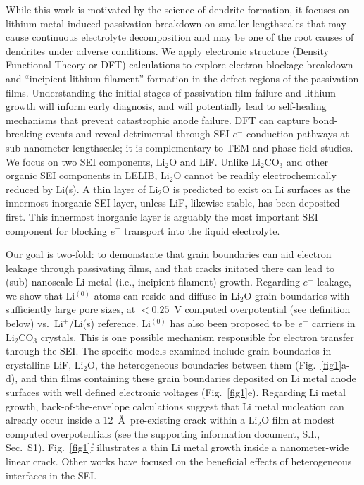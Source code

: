 \documentclass[prb,preprint,amsmath,amssymb]{revtex4}
\begin{document}
While this work is motivated by the science of dendrite formation, it
focuses on lithium metal-induced passivation breakdown on smaller lengthscales
that may cause continuous electrolyte decomposition and may be one of the
root causes of dendrites under adverse conditions.  We apply electronic
structure (Density Functional Theory or DFT) calculations to explore
electron-blockage breakdown and ``incipient lithium filament''
formation in the defect regions of the passivation films.  Understanding the
initial stages of passivation film failure and lithium growth will inform 
early diagnosis, and will potentially lead to self-healing mechanisms that
prevent catastrophic anode failure.  DFT can capture
bond-breaking events and reveal detrimental through-SEI $e^-$ conduction
pathways at sub-nanometer lengthscale; it is complementary to TEM and
phase-field studies.\cite{naturetem,garcia}  
We focus on two SEI components, Li$_2$O and LiF.
Unlike Li$_2$CO$_3$ and other organic SEI components in LELIB,\cite{batt}
Li$_2$O cannot be readily electrochemically reduced by Li(s).  A thin layer
of Li$_2$O is predicted to exist on Li surfaces as the innermost inorganic
SEI layer,\cite{batt} unless LiF, likewise stable, has been deposited first.
This innermost inorganic layer is arguably the most important SEI
component for blocking $e^-$ transport into the liquid electrolyte.\cite{yue}

Our goal is two-fold: to demonstrate that grain boundaries can aid electron
leakage through passivating films, and that cracks initated there can lead to
(sub)-nanoscale Li metal (i.e., incipient filament) growth.  Regarding $e^-$
leakage, we show that Li$^{(0)}$ atoms can reside and diffuse in Li$_2$O
grain boundaries with sufficiently large pore sizes, at $<0.25$~V computed
overpotential (see definition below) vs.~Li$^+$/Li(s) reference.  Li$^{(0)}$
has also been proposed to be $e^-$ carriers in Li$_2$CO$_3$
crystals.\cite{yueli2co3}   This is one possible mechanism responsible for
electron transfer through the
SEI.\cite{tang}  The specific models examined include grain boundaries in
crystalline LiF, Li$_2$O, the heterogeneous boundaries between them
(Fig.~\ref{fig1}a-d),
and thin films containing these grain
boundaries deposited on Li metal anode surfaces with well defined
electronic voltages\cite{solid} (Fig.~\ref{fig1}e).  Regarding Li metal
growth, back-of-the-envelope calculations suggest that Li metal nucleation
can already occur inside a 12~\AA\, pre-existing crack within a Li$_2$O film
at modest computed overpotentials (see the supporting information document,
S.I., Sec.~S1).  Fig.~\ref{fig1}f illustrates a thin Li metal growth inside
a nanometer-wide linear crack.  Other works have focused on the beneficial
effects of heterogeneous interfaces in the SEI.\cite{qi16} 
\end{document}
